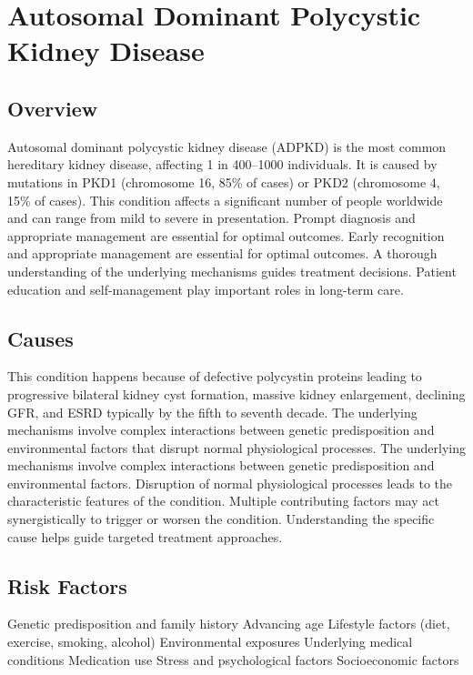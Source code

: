 \chapter{Autosomal Dominant Polycystic Kidney Disease}
\label{sec:Autosomal Dominant Polycystic Kidney Disease}

\section{Overview}
Autosomal dominant polycystic kidney disease (ADPKD) is the most common hereditary kidney disease, affecting 1 in 400--1000 individuals. It is caused by mutations in PKD1 (chromosome 16, 85\% of cases) or PKD2 (chromosome 4, 15\% of cases). This condition affects a significant number of people worldwide and can range from mild to severe in presentation. Prompt diagnosis and appropriate management are essential for optimal outcomes. Early recognition and appropriate management are essential for optimal outcomes. A thorough understanding of the underlying mechanisms guides treatment decisions. Patient education and self-management play important roles in long-term care.
\section{Causes}
This condition happens because of defective polycystin proteins leading to progressive bilateral kidney cyst formation, massive kidney enlargement, declining GFR, and ESRD typically by the fifth to seventh decade. The underlying mechanisms involve complex interactions between genetic predisposition and environmental factors that disrupt normal physiological processes. The underlying mechanisms involve complex interactions between genetic predisposition and environmental factors. Disruption of normal physiological processes leads to the characteristic features of the condition. Multiple contributing factors may act synergistically to trigger or worsen the condition. Understanding the specific cause helps guide targeted treatment approaches.
\section{Risk Factors}
Genetic predisposition and family history Advancing age Lifestyle factors (diet, exercise, smoking, alcohol) Environmental exposures Underlying medical conditions Medication use Stress and psychological factors Socioeconomic factors


